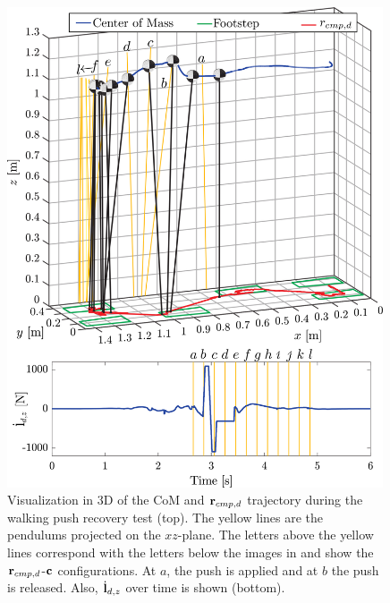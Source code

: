 \begin{figure}
     \centering
        \includegraphics[width=0.99\textwidth]{STYLESTUFF/walk3D2.png}
        \caption{Visualization in \ac{3D} of the \ac{CoM} and $\mathbf{r}_{cmp,d}$ trajectory during the walking push recovery test (top). The yellow lines are the pendulums projected on the $xz$-plane. The letters above the yellow lines correspond with the letters below the images in  and show the $\mathbf{r}_{cmp,d}$-$\mathbf{c}$ configurations. At $a$, the push is applied and at $b$ the push is released. Also, $\dot{\mathbf{l}}_{d,z}$ over time is shown (bottom).}
        \label{fig:walk3D}
\end{figure}

